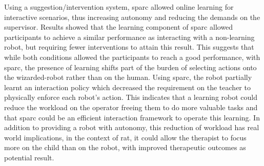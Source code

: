 Using a suggestion/intervention system, \gls{sparc} allowed online learning for interactive scenarios, thus increasing autonomy and reducing the demands on the supervisor. Results showed that the learning component of \gls{sparc} allowed participants to achieve a similar performance as interacting with a non-learning robot, but requiring fewer interventions to attain this result. This suggests that while both conditions allowed the participants to reach a good performance, with \gls{sparc}, the presence of learning shifts part of the burden of selecting actions onto the wizarded-robot rather than on the human. Using \gls{sparc}, the robot partially learnt an interaction policy which decreased the requirement on the teacher to physically enforce each robot's action. This indicates that a learning robot could reduce the workload on the operator freeing them to do more valuable tasks and that \gls{sparc} could be an efficient interaction framework to operate this learning. In addition to providing a robot with autonomy, this reduction of workload has real world implications, in the context of \gls{rat}, it could allow the therapist to focus more on the child than on the robot, with improved therapeutic outcomes as potential result. 

